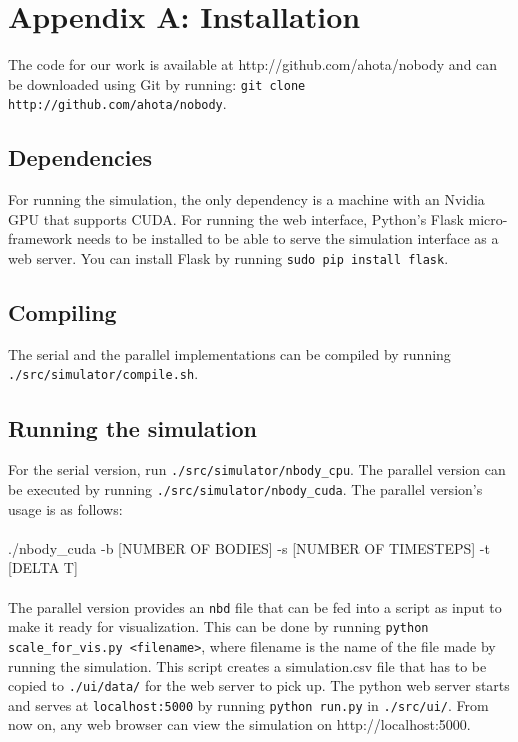 \documentclass[11pt,a4paper]{article}
\begin{document}
	\section{Appendix A: Installation}
		The code for our work is available at http://github.com/ahota/nobody and can be downloaded using Git by running: \texttt{git clone http://github.com/ahota/nobody}.
		
		\subsection{Dependencies}
		For running the simulation, the only dependency is a machine with an Nvidia GPU that supports CUDA. For running the web interface, Python's Flask micro-framework needs to be installed to be able to serve the simulation interface as a web server. You can install Flask by running \texttt{sudo pip install flask}. 
		
		\subsection{Compiling}
		The serial and the parallel implementations can be compiled by running \texttt{./src/simulator/compile.sh}. 
		
		\subsection{Running the simulation}
		For the serial version, run \texttt{./src/simulator/nbody\_cpu}.
		The parallel version can be executed by running \texttt{./src/simulator/nbody\_cuda}. The parallel version's usage is as follows:
		\\\\	
		./nbody\_cuda -b [NUMBER OF BODIES] -s [NUMBER OF TIMESTEPS] -t [DELTA T]
		\\\\
		The parallel version provides an \texttt{nbd} file that can be fed into a script as input to make it ready for visualization. This can be done by running \texttt{python scale\_for\_vis.py <filename>}, where filename is the name of the file made by running the simulation. This script creates a simulation.csv file that has to be copied to \texttt{./ui/data/} for the web server to pick up. The python web server starts and serves at \texttt{localhost:5000} by running \texttt{python run.py} in \texttt{./src/ui/}. From now on, any web browser can view the simulation on http://localhost:5000.
		
\end{document}

